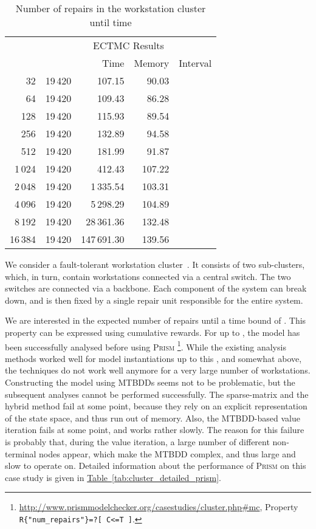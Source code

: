 \documentclass[10pt,twocolumn]{article}
\newcommand{\PRISM}{\textsc{Prism}\xspace}
\newcommand{\reftab}[1]{\texorpdfstring{\hyperref[tab:#1]{Table~\ref*{tab:#1}}}{Table~\ref*{tab:#1}}}
\begin{document}
\begin{table}[tb]
  \centering
  \caption{\label{tab:cluster}Number of repairs in the workstation cluster until time }
\begin{tabular}{|r|rrrc|}
\hline
     & \multicolumn{4}{c|}{ECTMC Results} \\
  &  & Time & Memory & Interval \\
\hline
32 & 19\,420 & 107.15 & 90.03 &  \\
64 & 19\,420 & 109.43 & 86.28 &  \\
128 & 19\,420 & 115.93 & 89.54 &  \\
256 & 19\,420 & 132.89 & 94.58 &  \\
512  & 19\,420 & 181.99 & 91.87 &  \\
1\,024 & 19\,420 & 412.43 & 107.22 &  \\
2\,048 & 19\,420 & 1\,335.54 & 103.31 &  \\
4\,096 & 19\,420 & 5\,298.29 & 104.89 &  \\
8\,192 & 19\,420 & 28\,361.36 & 132.48 &  \\
16\,384 & 19\,420 & 147\,691.30 & 139.56 &  \\
\hline
\end{tabular}
\end{table}
We consider a fault-tolerant workstation cluster~\cite{HaverkortHK00}. It consists of two
sub-clusters, which, in turn, contain  workstations connected via a
central switch. The two switches are connected via a backbone. Each
component of the system can break down, and is then fixed by a single
repair unit responsible for the entire system.

We are interested in the expected number of repairs until a time bound of .
This property can be expressed using cumulative
rewards. For  up to , the model has been successfully
analysed before using \PRISM
\footnote{\url{http://www.prismmodelchecker.org/casestudies/cluster.php\#mc},
Property \texttt{R\{"num\_repairs"\}=?[ C<=T ]}. }. While the
existing analysis methods worked well for model instantiations up to
this , and somewhat above, the techniques do not work well anymore
for a very large number of workstations. Constructing the model using
MTBDDs seems not to be problematic, but the subsequent analyses cannot
be performed successfully. The sparse-matrix and the hybrid method
fail at some point, because they rely on an explicit representation of
the state space, and thus run out of memory. Also, the MTBDD-based
value iteration fails at some point, and works rather slowly. The
reason for this failure is probably that, during the value iteration, a large number of
different non-terminal nodes appear, which make the MTBDD complex, and
thus large and slow to operate on. Detailed information about the
performance of \PRISM on this case study is given in \reftab{cluster_detailed_prism}.
\end{document}
